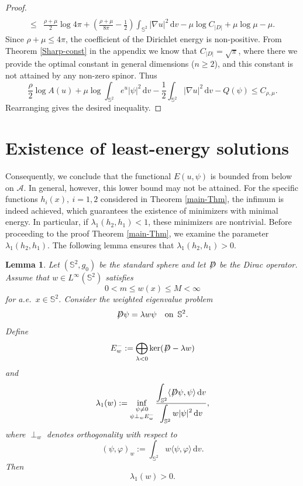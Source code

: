 \documentclass[a4paper, 12pt]{article}
\newtheorem{lemma}[theorem]{Lemma}
\def\slashiii#1{\setbox0=\hbox{$#1$}#1\hskip-\wd0\hbox to\wd0{\hss\sl/\/\hss}}
\begin{document}
\begin{proof}
\[\begin{aligned}
		\\
		\le&\frac{\rho+\mu}{2}\log4\pi
		+\left(\frac{\rho+\mu}{8\pi}-\frac12\right)\int_{\mathbb{S}^2}|\nabla u|^2\,\text{d}v
		-\mu\log C_{|D|}
		+\mu\log\mu-\mu .
	\end{aligned}
	\]
	Since $\rho+\mu\le 4\pi$, the coefficient of the Dirichlet energy is non-positive. From Theorem \ref{Sharp-const} in the appendix we know that \(C_{|D|} = \sqrt \pi  \), where there we provide the optimal constant in general dimensions (\(n \geq 2\)), and this constant is not attained by any non-zero spinor. Thus
	\[
	\frac{\rho}{2}\log A(u)
	+\mu\log\int_{\mathbb{S}^2}e^u|\psi|^2\,\text{d}v
	-\frac12\int_{\mathbb{S}^2}|\nabla u|^2\,\text{d}v
	-Q(\psi)
	\le
	C_{\rho,\mu}.
	\]
	Rearranging gives the desired inequality.
\end{proof}
\section{Existence of least-energy solutions}
Consequently, we conclude that the functional $E(u,\psi)$ is bounded from below on $\mathcal{A}$. In general, however, this lower bound may not be attained. For the specific functions $h_i(x),\ i=1,2$ considered in Theorem \ref{main-Thm}, the infimum is indeed achieved, which guarantees the existence of minimizers with minimal energy. In particular, if ${\lambda _1}\left( {h_2},{h_1}\right) < 1$, these minimizers are nontrivial. Before proceeding to the proof Theorem \ref{main-Thm}, we examine the parameter ${\lambda _1}\left( {h_2},{h_1}\right)$. The following lemma ensures that ${\lambda _1}\left( {h_2},{h_1}\right)> 0$.
\begin{lemma}\label{Eigen-positve}
	Let $(\mathbb{S}^2,g_0)$ be the standard sphere and let $\slashiii{D}$ be the Dirac operator.
	Assume that $w\in L^\infty(\mathbb{S}^2)$ satisfies
	\[
	0<m\le w(x)\le M<\infty
	\]
	for a.e.\ $x\in \mathbb{S}^2$. Consider the weighted eigenvalue problem
	\[
	\slashiii{D}\psi=\lambda w\psi\quad \text{on } \,\mathbb{S}^2.
	\]
	Define
	\[
	E_w^-:=\bigoplus_{\lambda<0}\ker(\slashiii{D}-\lambda w)
	\]
	and
	\[
	\lambda_1(w)
	:=
	\inf_{\substack{\psi\neq0\\ \psi\perp_w E_w^-}}
	\frac{\displaystyle\int_{\mathbb{S}^2}\langle \slashiii{D}\psi,\psi\rangle\,\text{d}v}
	{\displaystyle\int_{\mathbb{S}^2}w|\psi|^2\,\text{d}v},
	\]
	where $\perp_w$ denotes orthogonality with respect to
	\[
	(\psi,\varphi)_w:=		\int_{\mathbb{S}^2}w\langle\psi,\varphi\rangle\,\text{d}v.
	\]
	Then
	\[
	\lambda_1(w)>0.
	\]
\end{lemma}
\end{document}
